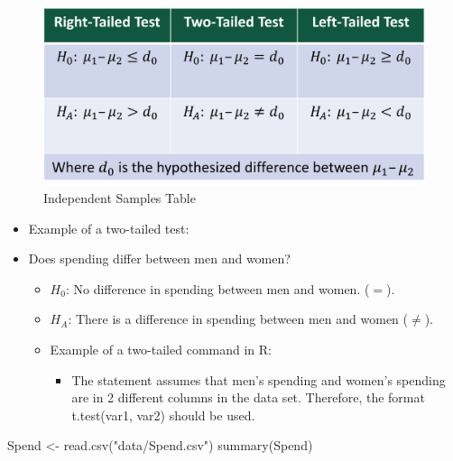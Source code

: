 \documentclass[
  letterpaper,
  DIV=11,
  numbers=noendperiod]{scrreprt}
\newenvironment{Shaded}{\begin{snugshade}}{\end{snugshade}}
\newcommand{\FunctionTok}[1]{\textcolor[rgb]{0.28,0.35,0.67}{#1}}
\newcommand{\NormalTok}[1]{\textcolor[rgb]{0.00,0.23,0.31}{#1}}
\newcommand{\OtherTok}[1]{\textcolor[rgb]{0.00,0.23,0.31}{#1}}
\newcommand{\StringTok}[1]{\textcolor[rgb]{0.13,0.47,0.30}{#1}}
\providecommand{\tightlist}{%
  \setlength{\itemsep}{0pt}\setlength{\parskip}{0pt}}\usepackage{longtable,booktabs,array}
\begin{document}
\begin{figure}[H]

{\centering \includegraphics{Pictures/Ch6/TableIndSamp.png}

}

\caption{Independent Samples Table}

\end{figure}%

\begin{itemize}
\tightlist
\item
  Example of a two-tailed test:
\item
  Does spending differ between men and women?

  \begin{itemize}
  \tightlist
  \item
    \(H_0\): No difference in spending between men and women. (\(=\)).
  \item
    \(H_A\): There is a difference in spending between men and women
    (\(\neq\)).
  \item
    Example of a two-tailed command in R:

    \begin{itemize}
    \tightlist
    \item
      The statement assumes that men's spending and women's spending are
      in 2 different columns in the data set. Therefore, the format
      t.test(var1, var2) should be used.
    \end{itemize}
  \end{itemize}
\end{itemize}

\begin{Shaded}
\begin{Highlighting}[]
\NormalTok{Spend }\OtherTok{\textless{}{-}} \FunctionTok{read.csv}\NormalTok{(}\StringTok{"data/Spend.csv"}\NormalTok{)}
\FunctionTok{summary}\NormalTok{(Spend)}
\end{Highlighting}
\end{Shaded}
\end{document}
